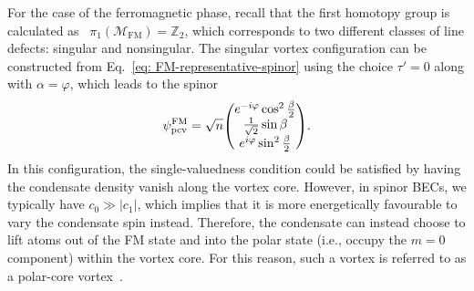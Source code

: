 For the case of the ferromagnetic phase, recall that the first homotopy group is
calculated as~\cite{Kawaguchi2012} \(\pi_1(\mathcal{M}_\text{FM})
= {\mathbb{Z}}_2\), which corresponds to two different classes of line defects:
singular and nonsingular.
The singular vortex configuration can be constructed from
Eq.~\eqref{eq: FM-representative-spinor} using the choice \(\tau'=0\) along with
\(\alpha = \varphi \), which leads to the spinor
\begin{align}
    \psi^\text{FM}_\text{pcv} =
    \sqrt{n}\mqty(
    e^{-i\varphi}\cos^2\frac{\beta}{2} \\
    \frac{1}{\sqrt{2}}\sin\beta \\
    e^{i\varphi}\sin^2\frac{\beta}{2}
    ).
\end{align}
In this configuration, the single-valuedness condition could be satisfied by
having the condensate density vanish along the vortex core.
However, in spinor BECs, we typically have \(c_0 \gg |c_1|\), which implies
that it is more energetically favourable to vary the condensate spin instead.
Therefore, the condensate can instead choose to lift atoms out of the FM state
and into the polar state (i.e., occupy the \(m=0\) component) within the vortex
core.
For this reason, such a vortex is referred to as a polar-core
vortex~\cite{Kawaguchi2012}.

